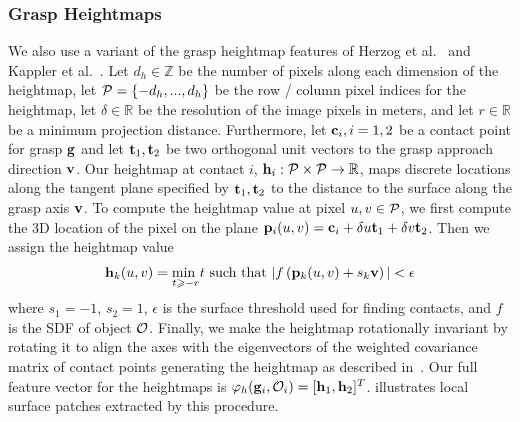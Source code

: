\subsubsection{Grasp Heightmaps}
We also use a variant of the grasp heightmap features of Herzog et al.~\cite{herzog2012template} and Kappler et al.~\cite{kappler2015leveraging}.
Let $d_h \in \mathbb{Z}$ be the number of pixels along each dimension of the heightmap, let $\mathcal{P} = \{-d_h, ..., d_h\}$ be the row / column pixel indices for the heightmap, let $\delta \in \mathbb{R}$ be the resolution of the image pixels in meters, and let $r \in \mathbb{R}$ be a minimum projection distance.
Furthermore, let $\mathbf{c}_i, i = 1, 2$ be a contact point for grasp $\mathbf{g}$ and let $\mathbf{t}_1, \mathbf{t}_2$ be two orthogonal unit vectors to the grasp approach direction $\mathbf{v}$.
Our heightmap at contact $i$, $\mathbf{h}_{i}: \mathcal{P} \times \mathcal{P} \rightarrow \mathbb{R}$, maps discrete locations along the tangent plane specified by $\mathbf{t}_1, \mathbf{t}_2$ to the distance to the surface along the grasp axis $\mathbf{v}$.
To compute the heightmap value at pixel $u,v \in \mathcal{P}$, we first compute the 3D location of the pixel on the plane $\mathbf{p}_i(u,v) = \mathbf{c}_i + \delta u \mathbf{t}_1 + \delta v \mathbf{t}_2$.
Then we assign the heightmap value
\begin{align*}
	\mathbf{h}_k(u,v) = \underset{t \geqslant -r}{\text{min }} t \text{ such that } | f\left( \mathbf{p}_k(u,v) + s_k \mathbf{v} \right) | < \epsilon
\end{align*}
 where $s_1 = -1$, $s_2 = 1$, $\epsilon$ is the surface threshold used for finding contacts, and $f$ is the SDF of object $\mathcal{O}$. 
Finally, we make the heightmap rotationally invariant by rotating it to align the axes with the eigenvectors of the weighted covariance matrix of contact points generating the heightmap as described in~\cite{tombariunique}.
Our full feature vector for the heightmaps is $\varphi_{h}(\mathbf{g}_i, \mathcal{O}_i) = [\mathbf{h}_1, \mathbf{h}_2]^T$. 
 illustrates local surface patches extracted by this procedure.

